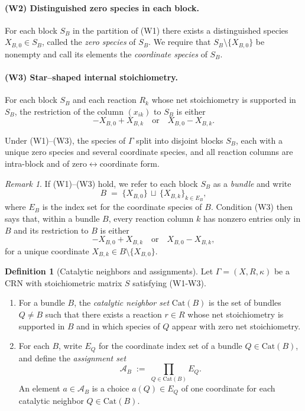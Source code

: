 \documentclass{article}
\theoremstyle{plain}
\theoremstyle{definition}
\newtheorem{definition}[theorem]{Definition}
\theoremstyle{remark}
\newtheorem{remark}[theorem]{Remark}
\newcommand{\Cat}{\textrm{Cat}}
\newcommand{\<}{\langle}
\renewcommand{\>}{\rangle}
\begin{document}
\paragraph*{(W2) Distinguished zero species in each block.}
For each block $S_B$ in the partition of \textup{(W1)} there exists a
distinguished species $X_{B,0}\in S_B$, called the \emph{zero species} of
$S_B$. We require that $S_B\setminus\{X_{B,0}\}$ be nonempty and call its elements the \emph{coordinate species} of $S_B$.

\paragraph*{(W3) Star--shaped internal stoichiometry.}
For each block $S_B$ and each reaction $R_k$ whose net stoichiometry is
supported in $S_B$, 
the restriction of the column $(x_{ik})$ to $S_B$ is either
\[
  -X_{B,0} + X_{B,k}
  \quad\text{or}\quad
  X_{B,0} - X_{B,k}.
\]

Under \textup{(W1)--(W3)}, the species of $\Gamma$ split into disjoint
blocks $S_B$, each with a unique zero species and several coordinate
species, and all reaction columns are intra-block and of
zero$\leftrightarrow$coordinate form.

\begin{remark}\label{rem:bundles}
If \textup{(W1)--(W3)} hold, we refer to each block $S_B$ as a
\emph{bundle} and write
\[
  B \;=\; \{X_{B,0}\} \,\sqcup\, \{X_{B,k}\}_{k\in E_B},
\]
where $E_B$ is the index set for the coordinate species of $B$.
Condition \textup{(W3)} then says that, within a bundle $B$, every
reaction column $k$ has nonzero entries only in
$B$ and its restriction to $B$ is either
\[
  -X_{B,0} + X_{B,k}
  \quad\text{or}\quad
  X_{B,0} - X_{B,k},
\]
for a unique coordinate $X_{B,k}\in B\setminus\{X_{B,0}\}$.
\end{remark}

\begin{definition}[Catalytic neighbors and assignments]\label{def:cat-assign}
Let $\Gamma = (X,R,\kappa)$ be a CRN with stoichiometric matrix $S$ satisfying (W1-W3).

\begin{enumerate}
  \item For a bundle $B$, the \emph{catalytic neighbor set} $\Cat(B)$ is the set
   of bundles $Q\neq B$ such that there exists a reaction $r\in R$
   whose net stoichiometry is supported in $B$ and in which species of $Q$
   appear with zero net stoichiometry.

  \item For each $B$, write $E_Q$ for the coordinate index
  set of a bundle $Q\in\Cat(B)$, and define the \emph{assignment set}
  \[
    \mathcal A_B \;:=\; \prod_{Q\in\Cat(B)} E_Q.
  \]
  An element $a\in\mathcal A_B$ is a choice $a(Q)\in E_Q$ of one
  coordinate for each catalytic neighbor $Q\in\Cat(B)$.
\end{enumerate}
\end{definition}
\end{document}
